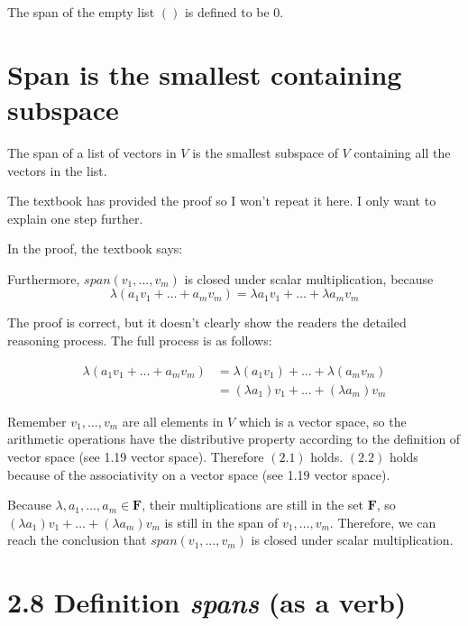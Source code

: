 \documentclass[12pt, letterpaper, oneside]{book}
\begin{document}
The span of the empty list $()$ is defined to be ${0}$.

\section{Span is the smallest containing subspace}

The span of a list of vectors in $V$ is the smallest subspace of $V$ containing
all the vectors in the list.

The textbook has provided the proof so I won't repeat it here. I only want to
explain one step further.

In the proof, the textbook says:

\begin{displayquote}
  Furthermore, $span(v_1, \ldots, v_m)$ is closed under scalar multiplication,
  because
  \[
    \lambda(a_1v_1 + \dots + a_mv_m) = \lambda a_1v_1 + \dots + \lambda a_mv_m
  \]
\end{displayquote}

The proof is correct, but it doesn't clearly show the readers the detailed
reasoning process. The full process is as follows:

\begin{align}
  \lambda(a_1v_1 + \dots + a_mv_m)
    & = \lambda(a_1v_1) + \dots + \lambda (a_mv_m) \\
    & = (\lambda a_1)v_1 + \dots + (\lambda a_m)v_m
\end{align}

Remember $v_1, \ldots, v_m$ are all elements in $V$ which is a vector space,
so the arithmetic operations have the distributive property according to the
definition of vector space (see 1.19 vector space). Therefore $(2.1)$ holds.
$(2.2)$ holds because of the associativity on a vector space (see 1.19 vector
space).

Because $\lambda, a_1, \ldots, a_m \in \mathbf{F}$, their multiplications are
still in the set $\mathbf{F}$, so $(\lambda a_1)v_1 + \dots + (\lambda a_m)v_m$
is still in the span of $v_1, \ldots, v_m$. Therefore, we can reach the
conclusion that $span(v_1, \ldots, v_m)$ is closed under scalar multiplication.

\section{2.8 Definition \textbf{\textit{spans}} (as a verb)}
\end{document}
